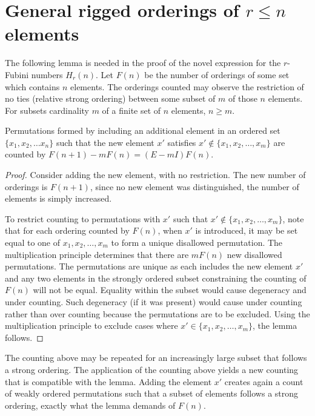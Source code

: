 \documentclass[12pt,reqno]{article}
\begin{document}
\section{General rigged orderings  of $r \leq n$ elements}

The following lemma is needed in the proof of the novel expression for the $r$-Fubini numbers $H_{r}(n)$. Let $F(n)$ be the number of orderings of some set which contains $n$ elements. The orderings counted may observe the restriction of no ties (relative strong ordering) between some subset of $m$ of those $n$ elements. For subsets cardinality $m$ of a finite set of $n$ elements, $n \geq m$.
\begin{lemma}\label{lm:counting}
	Permutations formed by including an additional element in an ordered set $\{x_{1}, x_{2}, \ldots x_{n}\}$ such that the new element $x'$ satisfies $x' \notin \{x_{1}, x_{2}, \ldots, x_{m}\}$  are counted by $F(n + 1) - mF(n) = (E - mI)F(n) $.

	\begin{proof}
		Consider adding the new element, with no restriction. The new number of orderings is $F(n + 1)$, since no new element was distinguished, the number of elements is simply increased.

		To restrict counting to permutations with $x'$ such that $x' \notin \{x_{1}, x_{2}, \ldots, x_{m}\}$, note that for each ordering counted by $F(n)$, when $x'$ is introduced, it may be set equal to one of ${x_{1}, x_{2}, \ldots, x_{m}}$ to form a unique disallowed permutation. The multiplication principle determines that there are $mF(n)$ new disallowed permutations. The permutations are unique as each includes the new element $x'$ and any two elements in the strongly ordered subset constraining the counting of $F(n)$ will not be equal. Equality within the subset would cause degeneracy and under counting. Such degeneracy (if it was present) would cause under counting rather than over counting because the permutations are to be excluded. Using the multiplication principle to exclude cases where $x' \in \{x_{1}, x_{2}, \ldots, x_{m}\}$, the lemma follows.
	\end{proof}
\end{lemma}
The counting above may be repeated for an increasingly large subset that follows a strong ordering. The application of the counting above yields a new counting that is compatible with the lemma. Adding the element $x'$ creates again a count of weakly ordered permutations such that a subset of elements follows a strong ordering, exactly what the lemma demands of $F(n)$.
\end{document}
